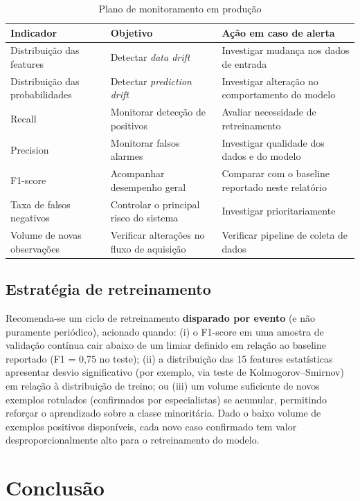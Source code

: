 \documentclass[12pt,a4paper]{article}
\begin{document}
\begin{table}[H]
\centering
\caption{Plano de monitoramento em produção}
\label{tab:monitoramento}
\small
\begin{tabular}{p{3.3cm}p{4.3cm}p{4.8cm}}
\toprule
\textbf{Indicador} & \textbf{Objetivo} & \textbf{Ação em caso de alerta} \\
\midrule
Distribuição das features & Detectar \textit{data drift} & Investigar mudança nos dados de entrada \\
Distribuição das probabilidades & Detectar \textit{prediction drift} & Investigar alteração no comportamento do modelo \\
Recall & Monitorar detecção de positivos & Avaliar necessidade de retreinamento \\
Precision & Monitorar falsos alarmes & Investigar qualidade dos dados e do modelo \\
F1-score & Acompanhar desempenho geral & Comparar com o baseline reportado neste relatório \\
Taxa de falsos negativos & Controlar o principal risco do sistema & Investigar prioritariamente \\
Volume de novas observações & Verificar alterações no fluxo de aquisição & Verificar pipeline de coleta de dados \\
\bottomrule
\end{tabular}
\end{table}

\subsection*{Estratégia de retreinamento}

Recomenda-se um ciclo de retreinamento \textbf{disparado por evento} (e não puramente periódico), acionado quando: (i) o F1-score em uma amostra de validação contínua cair abaixo de um limiar definido em relação ao baseline reportado (F1 = 0,75 no teste); (ii) a distribuição das 15 features estatísticas apresentar desvio significativo (por exemplo, via teste de Kolmogorov--Smirnov) em relação à distribuição de treino; ou (iii) um volume suficiente de novos exemplos rotulados (confirmados por especialistas) se acumular, permitindo reforçar o aprendizado sobre a classe minoritária. Dado o baixo volume de exemplos positivos disponíveis, cada novo caso confirmado tem valor desproporcionalmente alto para o retreinamento do modelo.


\section{Conclusão}
\end{document}
